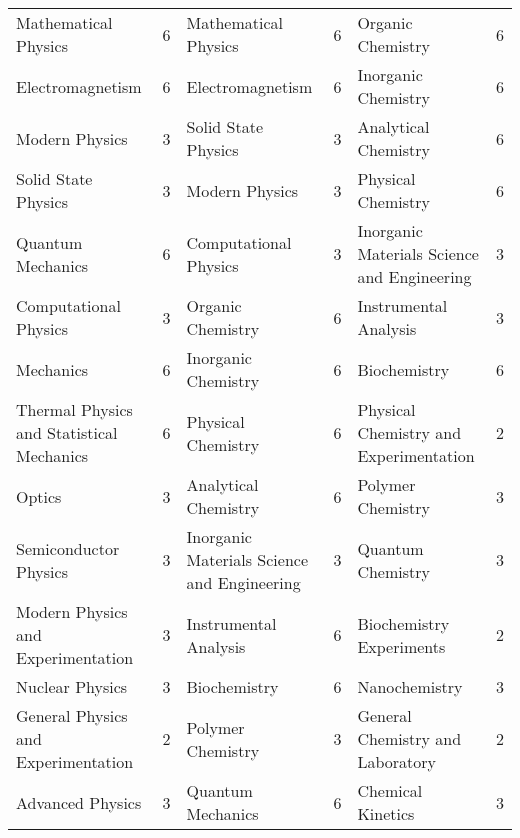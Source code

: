 \documentclass{bmcart}
\begin{document}
\begin{landscape}
\begin{longtable}{p{3.5cm}|p{1cm}|p{7cm}|p{1cm}|p{7cm}|p{1cm}}
\scriptsize Mathematical Physics & \scriptsize 6 & \scriptsize Mathematical Physics & \scriptsize 6 & \scriptsize Organic Chemistry & \scriptsize 6 \\
\scriptsize Electromagnetism & \scriptsize 6 & \scriptsize Electromagnetism & \scriptsize 6 & \scriptsize Inorganic Chemistry & \scriptsize 6 \\
\scriptsize Modern Physics & \scriptsize 3 & \scriptsize Solid State Physics & \scriptsize 3 & \scriptsize Analytical Chemistry & \scriptsize 6 \\
\scriptsize Solid State Physics & \scriptsize 3 & \scriptsize Modern Physics & \scriptsize 3 & \scriptsize Physical Chemistry & \scriptsize 6 \\
\scriptsize Quantum Mechanics & \scriptsize 6 & \scriptsize Computational Physics & \scriptsize 3 & \scriptsize Inorganic Materials Science and Engineering & \scriptsize 3 \\
\scriptsize Computational Physics & \scriptsize 3 & \scriptsize Organic Chemistry & \scriptsize 6 & \scriptsize Instrumental Analysis & \scriptsize 3 \\
\scriptsize Mechanics & \scriptsize 6 & \scriptsize Inorganic Chemistry & \scriptsize 6 & \scriptsize Biochemistry & \scriptsize 6 \\
\scriptsize Thermal Physics and Statistical Mechanics & \scriptsize 6 & \scriptsize Physical Chemistry & \scriptsize 6 & \scriptsize Physical Chemistry and Experimentation & \scriptsize 2 \\
\scriptsize Optics & \scriptsize 3 & \scriptsize Analytical Chemistry & \scriptsize 6 & \scriptsize Polymer Chemistry & \scriptsize 3 \\
\scriptsize Semiconductor Physics & \scriptsize 3 & \scriptsize Inorganic Materials Science and Engineering & \scriptsize 3 & \scriptsize Quantum Chemistry & \scriptsize 3 \\
\scriptsize Modern Physics and Experimentation & \scriptsize 3 & \scriptsize Instrumental Analysis & \scriptsize 6 & \scriptsize Biochemistry Experiments & \scriptsize 2 \\
\scriptsize Nuclear Physics & \scriptsize 3 & \scriptsize Biochemistry & \scriptsize 6 & \scriptsize Nanochemistry & \scriptsize 3 \\
\scriptsize General Physics and Experimentation & \scriptsize 2 & \scriptsize Polymer Chemistry & \scriptsize 3 & \scriptsize General Chemistry and Laboratory & \scriptsize 2 \\
\scriptsize Advanced Physics & \scriptsize 3 & \scriptsize Quantum Mechanics & \scriptsize 6 & \scriptsize Chemical Kinetics & \scriptsize 3 \\

\end{longtable}
\end{landscape}
\end{document}
